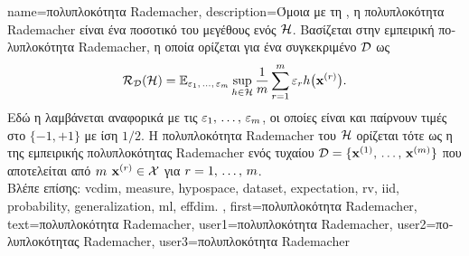 {name={\foreignlanguage{greek}{πολυπλοκότητα} Rademacher},
 	description={\foreignlanguage{greek}{Όμοια με τη} 
		, \foreignlanguage{greek}{η πολυπλοκότητα} Rademacher 
		\cite{bartlett2002rademacher} \foreignlanguage{greek}{είναι ένα ποσοτικό}  
		\foreignlanguage{greek}{του μεγέθους ενός}  $\mathcal{H}$. 
		\foreignlanguage{greek}{Βασίζεται στην εμπειρική πολυπλοκότητα} Rademacher, 
		\foreignlanguage{greek}{η οποία ορίζεται για ένα συγκεκριμένο}  
		$\mathcal{D}$ \foreignlanguage{greek}{ως}
		\begin{equation}
			\nonumber
    			\mathcal{R}_{\mathcal{D}}(\mathcal{H}) 
    			= 
    			\mathbb{E}_{\varepsilon_{1},\,\ldots,\,\varepsilon_{m} } 
			\sup_{h \in \mathcal{H}} \frac{1}{m} \sum_{r=1}^m \varepsilon_r 
			h\big({\bf x}^{(r)} \big).
    		\end{equation}
		\foreignlanguage{greek}{Εδώ η}  \foreignlanguage{greek}{λαμβάνεται αναφορικά με τις} 
		 \linebreak $\varepsilon_{1},\,\ldots,\,\varepsilon_{m}$,
		\foreignlanguage{greek}{οι οποίες είναι}  \foreignlanguage{greek}{και παίρνουν τιμές στο 
		$\{ -1, +1 \}$ με ίση}  $1/2$. \foreignlanguage{greek}{Η πολυπλοκότητα} Rademacher 
		\foreignlanguage{greek}{του $\mathcal{H}$ ορίζεται τότε ως η}  
		\foreignlanguage{greek}{της εμπειρικής πολυπλοκότητας} Rademacher \foreignlanguage{greek}{ενός 
		τυχαίου}  $\mathcal{D} = \{{\bf x}^{(1)}, \,\hdots, \,{\bf x}^{(m)}\}$
		\foreignlanguage{greek}{που αποτελείται από} $m$   
		${\bf x}^{(r)} \in \mathcal{X}$ \foreignlanguage{greek}{για} $r=1,\,\ldots,\,m$. 
		\\
        		\foreignlanguage{greek}{Βλέπε επίσης:} \gls{vcdim}, \gls{measure}, \gls{hypospace}, \gls{dataset}, 
		\gls{expectation}, \gls{rv}, \gls{iid}, \gls{probability}, \gls{generalization}, \gls{ml}, \gls{effdim}. },
	first={\foreignlanguage{greek}{πολυπλοκότητα} Rademacher},
	text={\foreignlanguage{greek}{πολυπλοκότητα} Rademacher},
	user1={\foreignlanguage{greek}{πολυπλοκότητα} Rademacher}, %
	user2={\foreignlanguage{greek}{πολυπλοκότητας} Rademacher}, %
	user3={\foreignlanguage{greek}{πολυπλοκότητα} Rademacher} %
}

